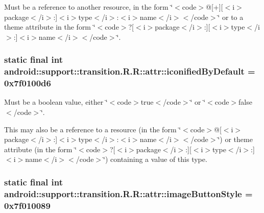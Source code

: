 Must be a reference to another resource, in the form \char`\"{}$<$code$>$@\mbox{[}+\mbox{]}\mbox{[}$<$i$>$package$<$/i$>$:\mbox{]}$<$i$>$type$<$/i$>$:$<$i$>$name$<$/i$>$$<$/code$>$\char`\"{} or to a theme attribute in the form \char`\"{}$<$code$>$?\mbox{[}$<$i$>$package$<$/i$>$:\mbox{]}\mbox{[}$<$i$>$type$<$/i$>$:\mbox{]}$<$i$>$name$<$/i$>$$<$/code$>$\char`\"{}. \hypertarget{classandroid_1_1support_1_1transition_1_1_r_1_1attr_827ffb6a08d342c0522e00fef2a96981}{
\subsubsection[{iconifiedByDefault}]{\setlength{\rightskip}{0pt plus 5cm}static final int android::support::transition.R.R::attr::iconifiedByDefault = 0x7f0100d6}}
\label{classandroid_1_1support_1_1transition_1_1_r_1_1attr_827ffb6a08d342c0522e00fef2a96981}


Must be a boolean value, either \char`\"{}$<$code$>$true$<$/code$>$\char`\"{} or \char`\"{}$<$code$>$false$<$/code$>$\char`\"{}. 

This may also be a reference to a resource (in the form \char`\"{}$<$code$>$@\mbox{[}$<$i$>$package$<$/i$>$:\mbox{]}$<$i$>$type$<$/i$>$:$<$i$>$name$<$/i$>$$<$/code$>$\char`\"{}) or theme attribute (in the form \char`\"{}$<$code$>$?\mbox{[}$<$i$>$package$<$/i$>$:\mbox{]}\mbox{[}$<$i$>$type$<$/i$>$:\mbox{]}$<$i$>$name$<$/i$>$$<$/code$>$\char`\"{}) containing a value of this type. \hypertarget{classandroid_1_1support_1_1transition_1_1_r_1_1attr_021a3ecb4d40097283ec71196e70169f}{
\subsubsection[{imageButtonStyle}]{\setlength{\rightskip}{0pt plus 5cm}static final int android::support::transition.R.R::attr::imageButtonStyle = 0x7f010089}}
\label{classandroid_1_1support_1_1transition_1_1_r_1_1attr_021a3ecb4d40097283ec71196e70169f}


